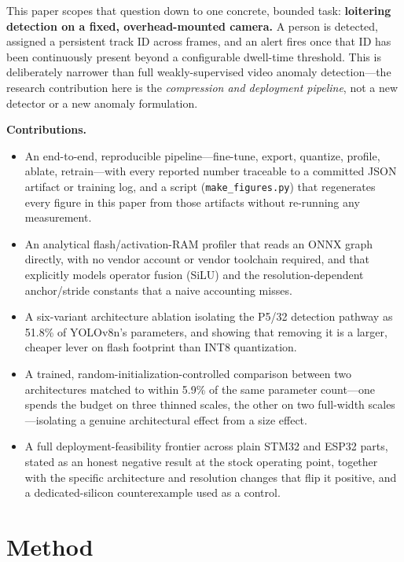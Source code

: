 \documentclass[11pt]{article}
\begin{document}
This paper scopes that question down to one concrete, bounded task:
\textbf{loitering detection on a fixed, overhead-mounted camera.} A person is
detected, assigned a persistent track ID across frames, and an alert fires
once that ID has been continuously present beyond a configurable dwell-time
threshold. This is deliberately narrower than full weakly-supervised video
anomaly detection---the research contribution here is the \emph{compression
and deployment pipeline}, not a new detector or a new anomaly formulation.

\textbf{Contributions.}
\begin{itemize}[leftmargin=1.4em, itemsep=0.2em]
  \item An end-to-end, reproducible pipeline---fine-tune, export, quantize,
  profile, ablate, retrain---with every reported number traceable to a
  committed JSON artifact or training log, and a script
  (\texttt{make\_figures.py}) that regenerates every figure in this paper
  from those artifacts without re-running any measurement.
  \item An analytical flash/activation-RAM profiler that reads an ONNX graph
  directly, with no vendor account or vendor toolchain required, and that
  explicitly models operator fusion (SiLU) and the resolution-dependent
  anchor/stride constants that a naive accounting misses.
  \item A six-variant architecture ablation isolating the P5/32 detection
  pathway as 51.8\% of YOLOv8n's parameters, and showing that removing it is
  a larger, cheaper lever on flash footprint than INT8 quantization.
  \item A trained, random-initialization-controlled comparison between two
  architectures matched to within 5.9\% of the same parameter count---one
  spends the budget on three thinned scales, the other on two full-width
  scales---isolating a genuine architectural effect from a size effect.
  \item A full deployment-feasibility frontier across plain STM32 and ESP32
  parts, stated as an honest negative result at the stock operating point,
  together with the specific architecture and resolution changes that flip
  it positive, and a dedicated-silicon counterexample used as a control.
\end{itemize}

\section{Method}
\end{document}

